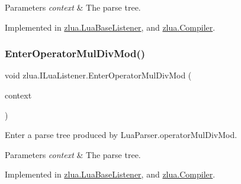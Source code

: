 \begin{DoxyParams}{Parameters}
{\em context} & The parse tree.\\
\hline
\end{DoxyParams}


Implemented in \mbox{\hyperlink{classzlua_1_1_lua_base_listener_a27a11e4053e2a7c40f464e0a893bbf70}{zlua.\+Lua\+Base\+Listener}}, and \mbox{\hyperlink{classzlua_1_1_compiler_ac4a8baa233d08987d8f276972567c343}{zlua.\+Compiler}}.

\mbox{\label{interfacezlua_1_1_i_lua_listener_ab6bb494a78b26f8483ef9d872c82c8d6}} 
\subsubsection{\texorpdfstring{Enter\+Operator\+Mul\+Div\+Mod()}{EnterOperatorMulDivMod()}}
{\footnotesize\ttfamily void zlua.\+I\+Lua\+Listener.\+Enter\+Operator\+Mul\+Div\+Mod (\begin{DoxyParamCaption}\item[{\mbox{[}\+Not\+Null\mbox{]} \mbox{\hyperlink{classzlua_1_1_lua_parser_1_1_operator_mul_div_mod_context}{Lua\+Parser.\+Operator\+Mul\+Div\+Mod\+Context}}}]{context }\end{DoxyParamCaption})}



Enter a parse tree produced by Lua\+Parser.\+operator\+Mul\+Div\+Mod. 


\begin{DoxyParams}{Parameters}
{\em context} & The parse tree.\\
\hline
\end{DoxyParams}


Implemented in \mbox{\hyperlink{classzlua_1_1_lua_base_listener_a4a1422260529c79e0e43d89652182159}{zlua.\+Lua\+Base\+Listener}}, and \mbox{\hyperlink{classzlua_1_1_compiler_a59d6144f868523b34a542792c6dfafa2}{zlua.\+Compiler}}.

\mbox{\label{interfacezlua_1_1_i_lua_listener_a9e722ddbc7e68d0fc367518365257711}} 

